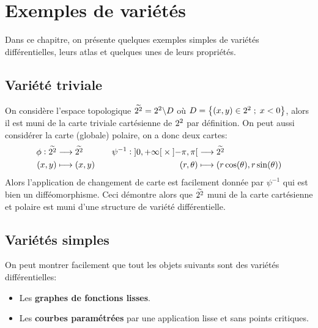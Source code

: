\chapter{Exemples de variétés}
   Dans ce chapitre, on présente quelques exemples simples de variétés différentielles, leurs atlas et quelques unes de leurs propriétés.
   \section{Variété triviale}
   On considère l'espace topologique \( \widetilde{2^2} = 2^2 \backslash D\) où \(D = \left\{ (x, y) \in 2^2 \; ; \; x < 0 \right\}\), alors il est muni de la carte triviale cartésienne de \( 2^2 \) par définition. On peut aussi considérer la carte (globale) polaire, on a donc deux cartes:
   \[ 
      \begin{aligned}
         \phi : \widetilde{\R^2} &\longrightarrow \widetilde{\R^2} \\
         (x, y) &\longmapsto (x, y)
      \end{aligned} \quad\quad
      \begin{aligned}
         \psi^{-1} : \ioo{0}{+\infty} \times \ioo{-\pi}{\pi} &\longrightarrow \widetilde{\R^2} \\
         (r, \theta) &\longmapsto (r \cos( \theta), r \sin( \theta))
      \end{aligned}
   \]
   Alors l'application de changement de carte est facilement donnée par \( \psi^{-1} \) qui est bien un difféomorphisme. Ceci démontre alors que \( \widetilde{2^2} \) muni de la carte cartésienne et polaire est muni d'une structure de variété différentielle. 
   \section{Variétés simples}
   On peut montrer facilement que tout les objets suivants sont des variétés différentielles:
   \begin{itemize}
      \item Les \textbf{graphes de fonctions lisses}.
      \item Les \textbf{courbes paramétrées} par une application lisse et sans points critiques.
   \end{itemize}
